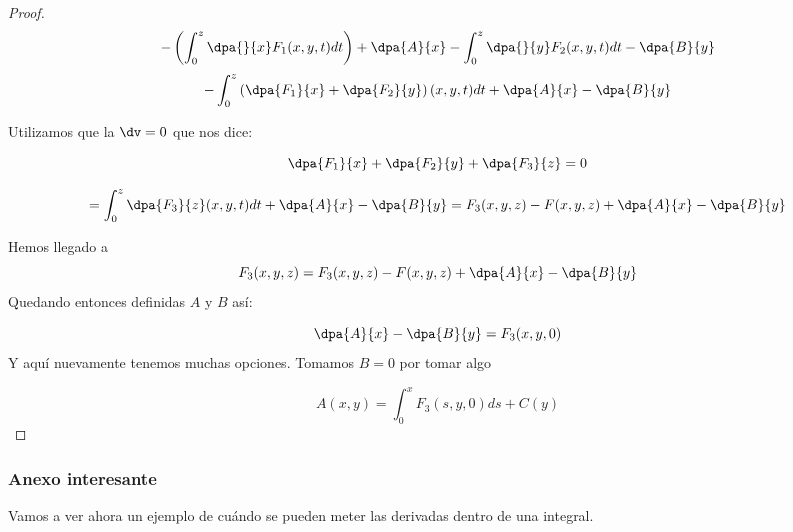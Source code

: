 \begin{proof}
\[-\left(\int_0^z \dpa{}{x}F_1(x,y,t)dt\right) + \dpa{A}{x} - \int_0^z \dpa{}{y}F_2(x,y,t)dt - \dpa{B}{y}\]
\[-\int_0^z \left(\dpa{F_1}{x} + \dpa{F_2}{y}\right)(x,y,t)dt + \dpa{A}{x} - \dpa{B}{y} \]

Utilizamos que la $\dv = 0$ que nos dice:

\[\dpa{F_1}{x} + \dpa{F_2}{y} + \dpa{F_3}{z} = 0\]

\[ = \int_0^z \dpa{F_3}{z} (x,y,t)dt + \dpa{A}{x} - \dpa{B}{y} = F_3(x,y,z) - F(x,y,z) + \dpa{A}{x} - \dpa{B}{y}\]

Hemos llegado a \[F_3(x,y,z) =  F_3(x,y,z) - F(x,y,z) + \dpa{A}{x} - \dpa{B}{y}\]
Quedando entonces definidas $A$ y $B$ así:

\[\dpa{A}{x} - \dpa{B}{y} = F_3(x,y,0)\]
Y aquí nuevamente tenemos muchas opciones. Tomamos $B=0$ por tomar algo

\[A(x,y) = \int_0^x F_3(s,y,0)ds + C(y)\]
\end{proof}

\subsubsection{Anexo interesante}
Vamos a ver ahora un ejemplo de cuándo se pueden meter las derivadas dentro de una integral.

